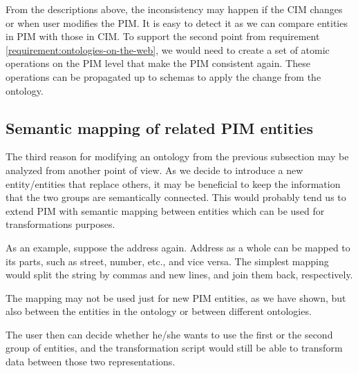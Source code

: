 From the descriptions above, the inconsistency may happen if the CIM changes or when user modifies the PIM. It is easy to detect it as we can compare entities in PIM with those in CIM. To support the second point from requirement \ref{requirement:ontologies-on-the-web}, we would need to create a set of atomic operations on the PIM level that make the PIM consistent again. These operations can be propagated up to schemas to apply the change from the ontology.


\newpage
\subsection{Semantic mapping of related PIM entities}

The third reason for modifying an ontology from the previous subsection may be analyzed from another point of view. As we decide to introduce a new entity/entities that replace others, it may be beneficial to keep the information that the two groups are semantically connected. This would probably tend us to extend PIM with semantic mapping between entities which can be used for transformations purposes.

As an example, suppose the address again. Address as a whole can be mapped to its parts, such as street, number, etc., and vice versa. The simplest mapping would split the string by commas and new lines, and join them back, respectively.

The mapping may not be used just for new PIM entities, as we have shown, but also between the entities in the ontology or between different ontologies.

The user then can decide whether he/she wants to use the first or the second group of entities, and the transformation script would still be able to transform data between those two representations.


